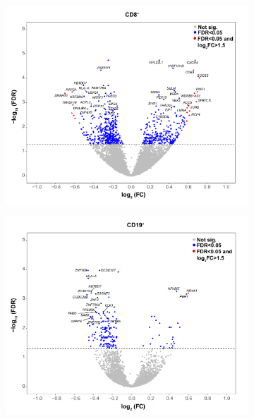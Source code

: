 \begin{figure}[htbp]
\begin{subfigure}{0.5\textwidth}
\caption{\textbf{}}
\end{subfigure}
\begin{subfigure}{0.5\textwidth}
\centering
\includegraphics[width=\textwidth]{./Results2/pdfs/RNA_PS_CTL_CD8_volcano_plot}
\caption{\textbf{}}
\end{subfigure}%
\begin{subfigure}{0.5\textwidth}
\centering
\includegraphics[width=\textwidth]{./Results2/pdfs/RNA_PS_CTL_CD19_volcano_plot}
\caption{\textbf{}}
\end{subfigure}

\end{figure}
